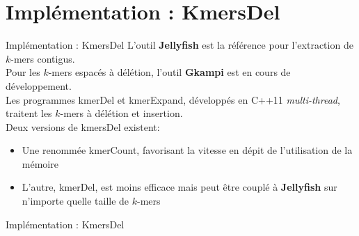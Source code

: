 \documentclass[11pt]{beamer}
\begin{document}
\section{Implémentation : KmersDel}
\begin{frame}[fragile]{Implémentation : KmersDel}
  L'outil \textbf{Jellyfish}\cite{Marcais2011} est la référence pour l'extraction de $k$-mers contigus.\medskip\\\pause
  Pour les $k$-mers espacés à délétion, l'outil \textbf{Gkampi}\cite{Mancheron} est en cours de développement.\medskip\\\pause
  Les programmes kmerDel et kmerExpand, développés en C++11 \textit{multi-thread}, traitent les $k$-mers à délétion et insertion.\medskip\\\pause
  Deux versions de kmersDel existent:\pause
  \begin{itemize}[<+-| alert@+>]
    \item Une renommée kmerCount, favorisant la vitesse en dépit de l'utilisation de la mémoire
    \item L'autre, kmerDel, est moins efficace mais peut être couplé à \textbf{Jellyfish} sur n'importe quelle taille de $k$-mers
  \end{itemize}
\end{frame}

\begin{frame}[fragile]{Implémentation : KmersDel}
  \scriptsize
  \begin{algorithm}[H]{
    \pause
  }\end{algorithm}
  \normalsize
\end{frame}
\end{document}
